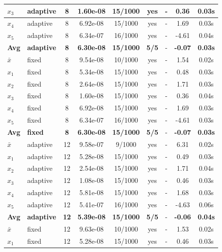 \begin{longtable}{|l|l|c|c|c|c|c|c|c|}
\hline
$x_3$ & adaptive & 8 & 1.60e-08 & 15/1000 & yes & - & 0.36 & 0.03s \\
\hline
$x_4$ & adaptive & 8 & 6.92e-08 & 15/1000 & yes & - & 1.69 & 0.03s \\
\hline
$x_5$ & adaptive & 8 & 6.34e-07 & 16/1000 & yes & - & -4.61 & 0.04s \\
\hline
\hline\hline
\textbf{Avg} & \textbf{adaptive} & \textbf{8} & \textbf{6.30e-08} & \textbf{15/1000} & \textbf{5/5} & - & \textbf{-0.07} & \textbf{0.03s} \\
\hline\hline
\hline
$\bar{x}$ & fixed & 8 & 9.54e-08 & 10/1000 & yes & - & 1.54 & 0.02s \\
\hline
$x_1$ & fixed & 8 & 5.34e-08 & 15/1000 & yes & - & 0.48 & 0.03s \\
\hline
$x_2$ & fixed & 8 & 2.64e-08 & 15/1000 & yes & - & 1.71 & 0.03s \\
\hline
$x_3$ & fixed & 8 & 1.60e-08 & 15/1000 & yes & - & 0.36 & 0.04s \\
\hline
$x_4$ & fixed & 8 & 6.92e-08 & 15/1000 & yes & - & 1.69 & 0.03s \\
\hline
$x_5$ & fixed & 8 & 6.34e-07 & 16/1000 & yes & - & -4.61 & 0.03s \\
\hline
\hline\hline
\textbf{Avg} & \textbf{fixed} & \textbf{8} & \textbf{6.30e-08} & \textbf{15/1000} & \textbf{5/5} & - & \textbf{-0.07} & \textbf{0.03s} \\
\hline\hline
$\bar{x}$ & adaptive & 12 & 9.58e-07 & 9/1000 & yes & - & 6.31 & 0.02s \\
\hline
$x_1$ & adaptive & 12 & 5.28e-08 & 15/1000 & yes & - & 0.49 & 0.03s \\
\hline
$x_2$ & adaptive & 12 & 2.54e-08 & 15/1000 & yes & - & 1.71 & 0.04s \\
\hline
$x_3$ & adaptive & 12 & 1.08e-08 & 15/1000 & yes & - & 0.46 & 0.03s \\
\hline
$x_4$ & adaptive & 12 & 5.81e-08 & 15/1000 & yes & - & 1.68 & 0.03s \\
\hline
$x_5$ & adaptive & 12 & 5.41e-07 & 16/1000 & yes & - & -4.63 & 0.06s \\
\hline
\hline\hline
\textbf{Avg} & \textbf{adaptive} & \textbf{12} & \textbf{5.39e-08} & \textbf{15/1000} & \textbf{5/5} & - & \textbf{-0.06} & \textbf{0.04s} \\
\hline\hline
\hline
$\bar{x}$ & fixed & 12 & 9.63e-08 & 10/1000 & yes & - & 1.53 & 0.02s \\
\hline
$x_1$ & fixed & 12 & 5.28e-08 & 15/1000 & yes & - & 0.46 & 0.03s \\

\end{longtable}
